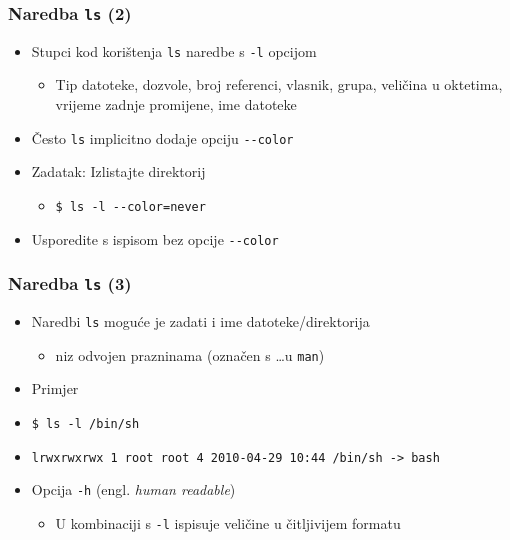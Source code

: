 \documentclass{beamer}
\begin{document}
\begin{frame}[t]
\frametitle{Naredba \texttt{ls} (2)}
\begin{itemize}
  \item Stupci kod korištenja \texttt{ls} naredbe s \texttt{-l} opcijom
  \begin{itemize}
    \item Tip datoteke, dozvole, broj referenci, vlasnik, grupa, veličina
          u oktetima, vrijeme zadnje promijene, ime datoteke
  \end{itemize}
  \item Često \texttt{ls} implicitno dodaje opciju \texttt{-{}-color}
  \item Zadatak: Izlistajte direktorij
  \begin{itemize}
    \item[] \texttt{\$ ls -l -{}-color=never}
  \end{itemize}
  \item Usporedite s ispisom bez opcije \texttt{-{}-color}
\end{itemize}
\end{frame}

\begin{frame}[t]
\frametitle{Naredba \texttt{ls} (3)}
\begin{itemize}
  \item Naredbi \texttt{ls} moguće je zadati i ime datoteke/direktorija
  \begin{itemize}
    \item niz odvojen prazninama (označen s \ldots u \texttt{man})
  \end{itemize}
  \item Primjer
  \item[] \small\texttt{\$ ls -l /bin/sh}
  \item[] \small\texttt{lrwxrwxrwx 1 root root 4 2010-04-29 10:44 /bin/sh 
                        -> bash}
  \item Opcija \texttt{-h} (engl. \emph{human readable})
  \begin{itemize}
    \item U kombinaciji s \texttt{-l} ispisuje veličine u čitljivijem
          formatu
  \end{itemize}
\end{itemize}
\end{frame}
\end{document}
